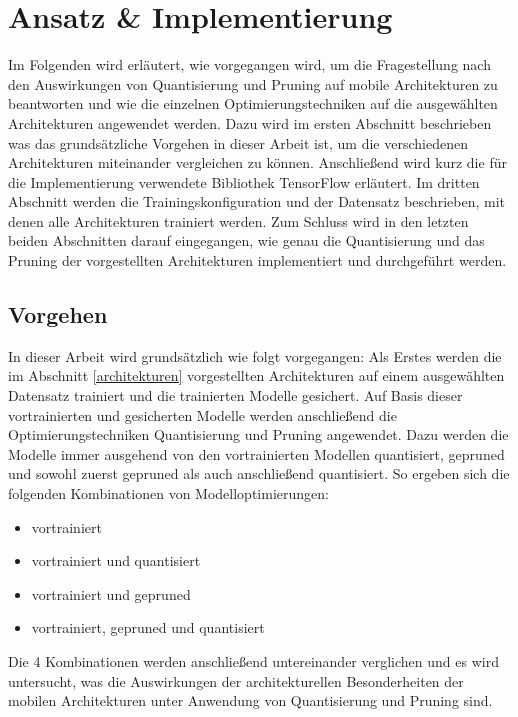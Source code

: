 \chapter{Ansatz \& Implementierung}
\label{ansatz_und_implementierung}
Im Folgenden wird erläutert, wie vorgegangen wird, um die Fragestellung nach den Auswirkungen von Quantisierung und Pruning auf mobile Architekturen zu beantworten und wie die einzelnen Optimierungstechniken auf die ausgewählten Architekturen angewendet werden. Dazu wird im ersten Abschnitt beschrieben was das grundsätzliche Vorgehen in dieser Arbeit ist, um die verschiedenen Architekturen miteinander vergleichen zu können. Anschließend wird kurz die für die Implementierung verwendete Bibliothek TensorFlow erläutert. Im dritten Abschnitt werden die Trainingskonfiguration und der Datensatz beschrieben, mit denen alle Architekturen trainiert werden. Zum Schluss wird in den letzten beiden Abschnitten darauf eingegangen, wie genau die Quantisierung und das Pruning der vorgestellten Architekturen implementiert und durchgeführt werden.



\section{Vorgehen}
\label{vorgehen}
In dieser Arbeit wird grundsätzlich wie folgt vorgegangen: Als Erstes werden die im Abschnitt \ref{architekturen} vorgestellten Architekturen auf einem ausgewählten Datensatz trainiert und die trainierten Modelle gesichert.
Auf Basis dieser vortrainierten und gesicherten Modelle werden anschließend die Optimierungstechniken Quantisierung und Pruning angewendet. Dazu werden die Modelle immer ausgehend von den vortrainierten Modellen quantisiert, gepruned und sowohl zuerst gepruned als auch anschließend quantisiert. So ergeben sich die folgenden Kombinationen von Modelloptimierungen:

\begin{itemize}
\item vortrainiert
\item vortrainiert und quantisiert
\item vortrainiert und gepruned
\item vortrainiert, gepruned und quantisiert
\end{itemize}

Die 4 Kombinationen werden anschließend untereinander verglichen und es wird untersucht, was die Auswirkungen der architekturellen Besonderheiten der mobilen Architekturen unter Anwendung von Quantisierung und Pruning sind.



